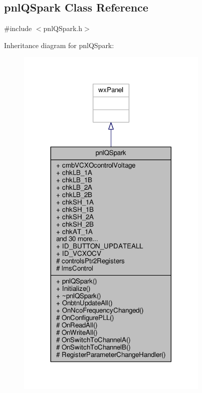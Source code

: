 \subsection{pnl\+Q\+Spark Class Reference}
\label{classpnlQSpark}


{\ttfamily \#include $<$pnl\+Q\+Spark.\+h$>$}



Inheritance diagram for pnl\+Q\+Spark\+:
\nopagebreak
\begin{figure}[H]
\begin{center}
\leavevmode
\includegraphics[width=260pt]{df/db1/classpnlQSpark__inherit__graph}
\end{center}
\end{figure}


